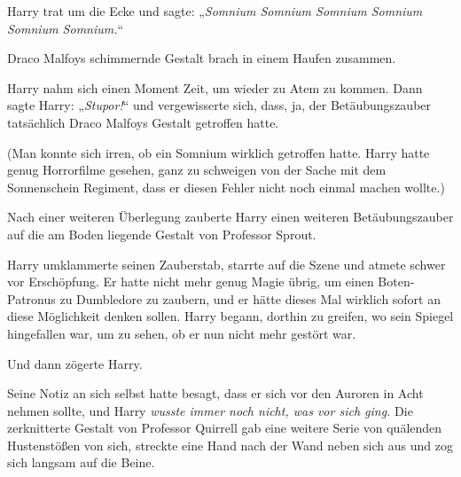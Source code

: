 Harry trat um die Ecke und sagte: „\emph{Somnium Somnium Somnium Somnium Somnium Somnium.}“

Draco Malfoys schimmernde Gestalt brach in einem Haufen zusammen.

Harry nahm sich einen Moment Zeit, um wieder zu Atem zu kommen. Dann sagte Harry: „\emph{Stupor!}“ und vergewisserte sich, dass, ja, der Betäubungszauber tatsächlich Draco Malfoys Gestalt getroffen hatte.

(Man konnte sich irren, ob ein Somnium wirklich getroffen hatte. Harry hatte genug Horrorfilme gesehen, ganz zu schweigen von der Sache mit dem Sonnenschein Regiment, dass er diesen Fehler nicht noch einmal machen wollte.)

Nach einer weiteren Überlegung zauberte Harry einen weiteren Betäubungszauber auf die am Boden liegende Gestalt von Professor Sprout.

Harry umklammerte seinen Zauberstab, starrte auf die Szene und atmete schwer vor Erschöpfung. Er hatte nicht mehr genug Magie übrig, um einen Boten-Patronus zu Dumbledore zu zaubern, und er hätte dieses Mal wirklich sofort an diese Möglichkeit denken sollen. Harry begann, dorthin zu greifen, wo sein Spiegel hingefallen war, um zu sehen, ob er nun nicht mehr gestört war.

Und dann zögerte Harry.


Seine Notiz an sich selbst hatte besagt, dass er sich vor den Auroren in Acht nehmen sollte, und Harry \emph{wusste immer noch nicht, was vor sich ging.}
Die zerknitterte Gestalt von Professor Quirrell gab eine weitere Serie von quälenden Hustenstößen von sich, streckte eine Hand nach der Wand neben sich aus und zog sich langsam auf die Beine.

